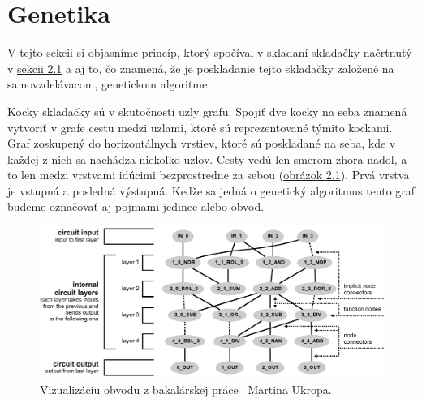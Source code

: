 \section{Genetika}
\label{sec:genetics}

V tejto sekcii si objasníme princíp, ktorý spočíval v skladaní skladačky načrtnutý v \hyperref[sec:nodes]{sekcii 2.1} a aj to, čo znamená, že je poskladanie tejto skladačky založené na samovzdelávacom, genetickom algoritme. 

Kocky skladačky sú v skutočnosti uzly grafu. Spojiť dve kocky na seba znamená vytvoriť v grafe cestu medzi uzlami, ktoré sú reprezentované týmito kockami. Graf zoskupený do horizontálnych vrstiev, ktoré sú poskladané na seba, kde v každej z nich sa nachádza niekoľko uzlov. Cesty vedú len smerom zhora nadol, a to len medzi vrstvami idúcimi bezprostredne za sebou (\hyperref[obr:circuit-example]{obrázok 2.1}). Prvá vrstva je vstupná a posledná výstupná. Keďže sa jedná o genetický algoritmus tento graf budeme označovať aj pojmami jedinec alebo obvod.

\begin{figure}[h!]
	\centering
	\includegraphics[scale=0.8]{./img/circuit-final.pdf}
	\caption{Vizualizáciu obvodu z {bakalárskej práce}~\parencite{ukrop-bc} Martina Ukropa.}
	\label{obr:circuit-example}
\end{figure}

